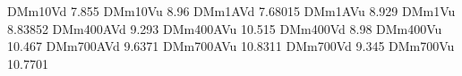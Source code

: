 DMm10Vd 7.855
DMm10Vu 8.96
DMm1AVd 7.68015
DMm1AVu 8.929
DMm1Vu 8.83852
DMm400AVd 9.293
DMm400AVu 10.515
DMm400Vd 8.98
DMm400Vu 10.467
DMm700AVd 9.6371
DMm700AVu 10.8311
DMm700Vd 9.345
DMm700Vu 10.7701
